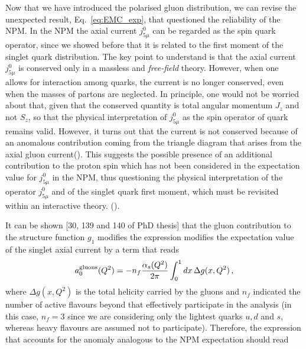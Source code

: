 Now that we have introduced the polarised gluon distribution, we can revise the unexpected result, Eq.~\eqref{eq:EMC_exp}, that questioned the reliability of the NPM. In the NPM the axial current $j_{5\mu}^{0}$ can be regarded as the spin quark operator, since we showed before that it is related to the first moment of the singlet quark distribution. The key point to understand is that the axial current $j_{5 \mu}^{0}$ is conserved only in a massless and \textit{free-field} theory. However, when one allows for interaction among quarks, the current is no longer conserved, even when the masses of partons are neglected. In principle, one would not be worried about that, given that the conserved quantity is total angular momentum $J_z$ and not $S_z$, so that the physical interpretation of $j_{5\mu}^{0}$ as the spin operator of quark remains valid. However, it turns out that the current is not conserved because of an anomalous contribution coming from the triangle diagram that arises from the axial gluon current(). This suggests the possible presence of an additional contribution to the proton spin which has not been considered in the expectation value for $j_{5\mu}^{0}$ in the NPM, thus questioning the physical interpretation of the operator $j_{5\mu}^{0}$ and of the singlet quark first moment, which must be revisited within an interactive theory. ().\par
It can be shown [30, 139 and 140 of PhD thesis] that the gluon contribution to the structure function $g_1$ modifies the expression modifies the expectation value of the singlet axial current by a term that reads
\begin{equation}
  a_{0}^{\textrm{gluons}}(Q^2) = - n_{f} \frac{\alpha_s(Q^2)}{2\pi} \int_{0}^{1} dx \, \Delta g (x, Q^2) \,,
\end{equation}
where $\Delta g (x,Q^2)$ is the total helicity carried by the gluons and $n_{f}$ indicated the number of active flavours beyond that effectively participate in the analysis (in this case, $n_f = 3$ since we are considering only the lightest quarks $u,d$ and $s$, whereas heavy flavours are assumed not to participate). Therefore, the expression that accounts for the anomaly analogous to the NPM expectation should read
